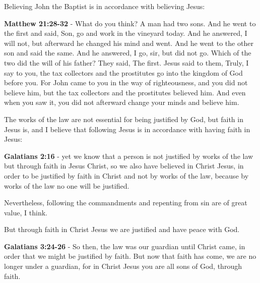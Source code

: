 \documentclass[11pt]{article}
\begin{document}
Believing John the Baptist is in accordance with believing Jesus:

\textbf{Matthew 21:28-32} - What do you think? A man had two sons. And he went to the first and said, Son, go and work in the vineyard today. And he answered, I will not, but afterward he changed his mind and went. And he went to the other son and said the same. And he answered, I go, sir, but did not go. Which of the two did the will of his father? They said, The first. Jesus said to them, Truly, I say to you, the tax collectors and the prostitutes go into the kingdom of God before you. For John came to you in the way of righteousness, and you did not believe him, but the tax collectors and the prostitutes believed him. And even when you saw it, you did not afterward change your minds and believe him.

The works of the law are not essential for being justified by God, but faith in Jesus is, and I believe that following Jesus is in accordance with having faith in Jesus:

\textbf{Galatians 2:16} - yet we know that a person is not justified by works of the law but through faith in Jesus Christ, so we also have believed in Christ Jesus, in order to be justified by faith in Christ and not by works of the law, because by works of the law no one will be justified.

Nevertheless, following the commandments and repenting from sin are of great value, I think.

But through faith in Christ Jesus we are justified and have peace with God.

\textbf{Galatians 3:24-26} - So then, the law was our guardian until Christ came, in order that we might be justified by faith. But now that faith has come, we are no longer under a guardian, for in Christ Jesus you are all sons of God, through faith.
\end{document}
